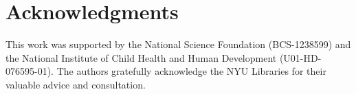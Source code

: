 \documentclass{sig-alternate}
\begin{document}
\section*{Acknowledgments}

This work was supported by the National Science Foundation (BCS-1238599) and the National Institute of Child Health and Human Development (U01-HD-076595-01).
The authors gratefully acknowledge the NYU Libraries for their valuable advice and consultation.



\end{document}
